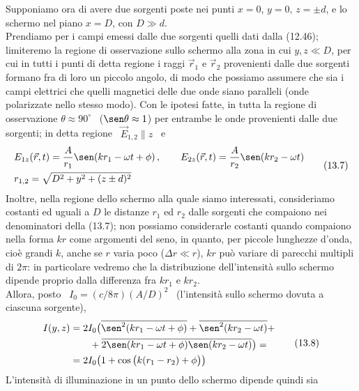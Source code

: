 Supponiamo ora di avere due sorgenti poste nei punti $x=0$, $y=0,\,z=\pm d$, e
lo schermo nel piano $x=D$, con $D\gg d$.\\
Prendiamo per i campi emessi dalle due sorgenti quelli dati dalla (12.46);
limiteremo la regione di osservazione sullo schermo alla zona in cui $y,z\ll D$,
per cui in tutti i punti di detta regione i raggi $\vec r_1$ e $\vec r_2$
provenienti dalle due sorgenti formano fra di loro un piccolo angolo, di modo
che possiamo assumere che sia i campi elettrici che quelli magnetici delle due
onde siano paralleli (onde polarizzate nello stesso modo). Con le ipotesi fatte,
in tutta la regione di osservazione $\theta\approx90^\circ$
\ ($\sen\theta\approx1$) per entrambe le onde provenienti dalle due sorgenti; in
detta regione \ $\vec E_{1,2}\parallel z$ \ e
\begin{equation}
  \begin{aligned}
    &E_{1z}(\vec r,t)=\frac{A}{r_1}\sen(kr_1-\omega t+\phi)\,,
    \qquad E_{2z}(\vec r,t)=\frac{A}{r_2}\sen(kr_2-\omega t)\\
    &r_{1,2}=\sqrt{D^2+y^2+(z\pm d)^2}
  \end{aligned}
  \tag{13.7}
\end{equation}
Inoltre, nella regione dello schermo alla quale siamo interessati, consideriamo
costanti ed uguali a $D$ le distanze $r_1$ ed $r_2$ dalle sorgenti che compaiono
nei denominatori della (13.7); non possiamo considerarle costanti quando
compaiono nella forma $kr$ come
argomenti del seno, in quanto, per piccole lunghezze d'onda, cio\`e grandi $k$,
anche se $r$ varia poco ($\Delta r\ll r$), $kr$ pu\`o variare di parecchi
multipli di $2\pi$: in particolare vedremo che la distribuzione dell'intensit\`a
sullo schermo dipende proprio dalla differenza fra $kr_1$ e $kr_2$.\\
Allora, posto \ $I_0=(c/8\pi)(A/D)^2$ \ (l'intensit\`a sullo schermo dovuta a
ciascuna sorgente),
\begin{equation}
  \begin{aligned}
    I(y,z)&=2I_0\big(\overline{\sen^2(kr_1-\omega t+\phi)}
    +\overline{\sen^2(kr_2-\omega t)}+\\
    &\qquad+\overline{2\sen(kr_1-\omega t+\phi)\sen(kr_2-\omega t)}\big)=\\
    &=2I_0\big(1+\cos\big(k(r_1-r_2)+\phi\big)\big)
  \end{aligned}
  \tag{13.8}
\end{equation}
L'intensit\`a di illuminazione in un punto dello schermo dipende quindi sia
